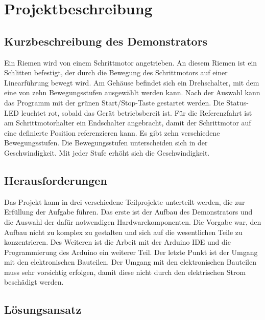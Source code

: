%
%
%


\chapter{Projektbeschreibung}

\section{Kurzbeschreibung des Demonstrators}

Ein Riemen wird von einem Schrittmotor angetrieben. An diesem Riemen ist ein Schlitten befestigt, der durch die Bewegung des Schrittmotors auf einer Linearführung bewegt wird. Am Gehäuse befindet sich ein Drehschalter, mit dem eine von zehn Bewegungsstufen ausgewählt werden kann. Nach der Auswahl kann das Programm mit der grünen Start/Stop-Taste gestartet werden. Die Status-LED leuchtet rot, sobald das Gerät betriebsbereit ist. Für die Referenzfahrt ist am Schrittmotorhalter ein Endschalter angebracht, damit der Schrittmotor auf eine definierte Position referenzieren kann. Es gibt zehn verschiedene Bewegungsstufen. Die Bewegungsstufen unterscheiden sich in der Geschwindigkeit. Mit jeder Stufe erhöht sich die Geschwindigkeit.

\section{Herausforderungen} 

Das Projekt kann in drei verschiedene Teilprojekte unterteilt werden, die zur Erfüllung der Aufgabe führen. Das erste ist der Aufbau des Demonstrators und die Auswahl der dafür notwendigen Hardwarekomponenten. Die Vorgabe war, den Aufbau nicht zu komplex zu gestalten und sich auf die wesentlichen Teile zu konzentrieren. Des Weiteren ist die Arbeit mit der Arduino IDE und die Programmierung des Arduino ein weiterer Teil. Der letzte Punkt ist der Umgang mit den elektronischen Bauteilen. Der Umgang mit den elektronischen Bauteilen muss sehr vorsichtig erfolgen, damit diese nicht durch den elektrischen Strom beschädigt werden.

\section{Lösungsansatz}

